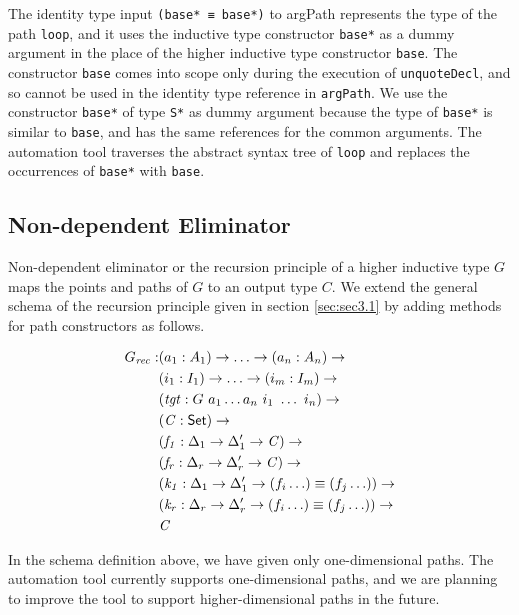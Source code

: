 \documentclass[sigplan,10pt]{acmart}
\begin{document}
The identity type input {\tt (base* ≡ base*)} to argPath represents the type of the path {\tt loop}, and it uses the inductive type constructor {\tt base*} as a dummy argument in the place of the higher inductive type constructor {\tt base}. The constructor {\tt base} comes into scope only during the execution of {\tt unquoteDecl}, and so cannot be used in the identity type reference in {\tt argPath}. We use the constructor {\tt base*} of type {\tt S*} as dummy argument because the type of {\tt base*} is similar to {\tt base}, and has the same references for the common arguments. The automation tool traverses the abstract syntax tree of {\tt loop} and replaces the occurrences of {\tt base*} with {\tt base}.

\subsection{Non-dependent Eliminator}
\label{sec:sec4.2}

Non-dependent eliminator or the recursion principle of a higher inductive type $G$ maps the points and paths of $G$ to an output type $C$. We extend the general schema of the recursion principle given in section \eqref{sec:sec3.1} by adding methods for path constructors as follows.

\begin{align*}
G_{\mathit{rec}} : & (a_1 : A_1) \to \ldots \to (a_n : A_n) \to\\
& (i_1 : I_1) \to \ldots \to (i_m : I_m) \to\\
& (\mathit{tgt} : G\ a_1 \ldots a_n\ i_1\ \ldots\ i_n) \to\\
& (\mathit{C} : \textsf{Set}{}) \to \\
& (\mathit{f_1} : \Delta_1 \to  \Delta_1^\prime \to \mathit{C}) \to \\
& (\mathit{f_r} : \Delta_r \to  \Delta_r^\prime \to \mathit{C}) \to \\
& (\mathit{k_1} : \Delta_1 \to  \Delta_1^\prime \to (f_i \ldots) \equiv (f_j \ldots)) \to \\
& (\mathit{k_r} : \Delta_r \to  \Delta_r^\prime \to (f_i \ldots) \equiv (f_j \ldots)) \to \\
& \mathit{C}
\end{align*}
 
In the schema definition above, we have given only one-dimensional paths. The automation tool currently supports one-dimensional paths, and we are planning to improve the tool to support higher-dimensional paths in the future. 
\end{document}
